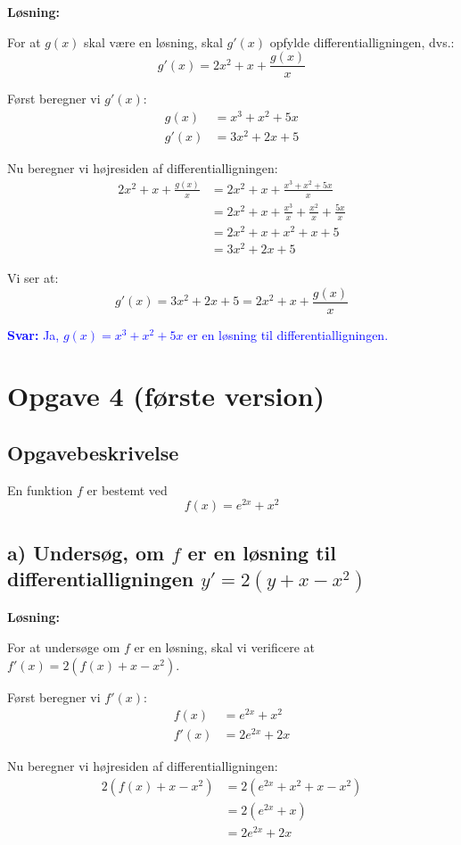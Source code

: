 \documentclass[a4paper,12pt]{article}
\begin{document}
\textbf{Løsning:}

For at $g(x)$ skal være en løsning, skal $g'(x)$ opfylde differentialligningen, dvs.:
\[
g'(x) = 2x^2 + x + \frac{g(x)}{x}
\]

Først beregner vi $g'(x)$:
\begin{align*}
g(x) &= x^3 + x^2 + 5x \\
g'(x) &= 3x^2 + 2x + 5
\end{align*}

Nu beregner vi højresiden af differentialligningen:
\begin{align*}
2x^2 + x + \frac{g(x)}{x} &= 2x^2 + x + \frac{x^3 + x^2 + 5x}{x} \\
&= 2x^2 + x + \frac{x^3}{x} + \frac{x^2}{x} + \frac{5x}{x} \\
&= 2x^2 + x + x^2 + x + 5 \\
&= 3x^2 + 2x + 5
\end{align*}

Vi ser at:
\[
g'(x) = 3x^2 + 2x + 5 = 2x^2 + x + \frac{g(x)}{x}
\]

\textcolor{blue}{\textbf{Svar:} Ja, $g(x) = x^3 + x^2 + 5x$ er en løsning til differentialligningen.}

\newpage

\section*{Opgave 4 (første version)}

\subsection*{Opgavebeskrivelse}
En funktion $f$ er bestemt ved
\[
f(x) = e^{2x} + x^2
\]

\subsection*{a) Undersøg, om $f$ er en løsning til differentialligningen $y' = 2(y + x - x^2)$}

\textbf{Løsning:}

For at undersøge om $f$ er en løsning, skal vi verificere at $f'(x) = 2(f(x) + x - x^2)$.

Først beregner vi $f'(x)$:
\begin{align*}
f(x) &= e^{2x} + x^2 \\
f'(x) &= 2e^{2x} + 2x
\end{align*}

Nu beregner vi højresiden af differentialligningen:
\begin{align*}
2(f(x) + x - x^2) &= 2(e^{2x} + x^2 + x - x^2) \\
&= 2(e^{2x} + x) \\
&= 2e^{2x} + 2x
\end{align*}
\end{document}
